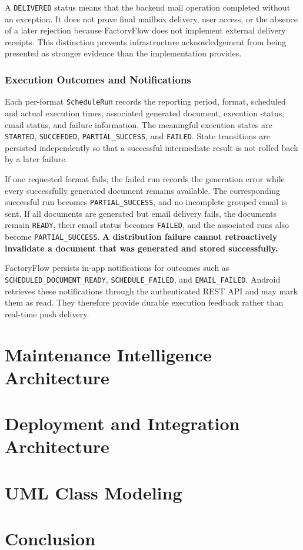 A \texttt{DELIVERED} status means that the backend mail operation completed without an exception. It does not prove final mailbox delivery, user access, or the absence of a later rejection because FactoryFlow does not implement external delivery receipts. This distinction prevents infrastructure acknowledgement from being presented as stronger evidence than the implementation provides.

\subsubsection{Execution Outcomes and Notifications}

Each per-format \texttt{ScheduleRun} records the reporting period, format, scheduled and actual execution times, associated generated document, execution status, email status, and failure information. The meaningful execution states are \texttt{STARTED}, \texttt{SUCCEEDED}, \texttt{PARTIAL\_SUCCESS}, and \texttt{FAILED}. State transitions are persisted independently so that a successful intermediate result is not rolled back by a later failure.

If one requested format fails, the failed run records the generation error while every successfully generated document remains available. The corresponding successful run becomes \texttt{PARTIAL\_SUCCESS}, and no incomplete grouped email is sent. If all documents are generated but email delivery fails, the documents remain \texttt{READY}, their email status becomes \texttt{FAILED}, and the associated runs also become \texttt{PARTIAL\_SUCCESS}. \textbf{A distribution failure cannot retroactively invalidate a document that was generated and stored successfully.}

FactoryFlow persists in-app notifications for outcomes such as \texttt{SCHEDULED\_DOCUMENT\_READY}, \texttt{SCHEDULE\_FAILED}, and \texttt{EMAIL\_FAILED}. Android retrieves these notifications through the authenticated REST API and may mark them as read. They therefore provide durable execution feedback rather than real-time push delivery.
\section{Maintenance Intelligence Architecture}

\section{Deployment and Integration Architecture}

\section{UML Class Modeling}

\section{Conclusion}
